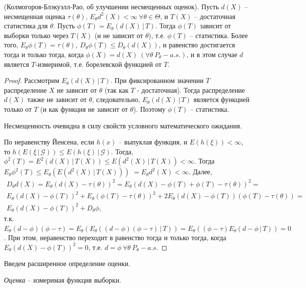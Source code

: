 \begin{theorem}
    (Колмогоров-Блэкуэлл-Рао, об улучшении несмещенных оценок). Пусть $d(X)$ -- несмещенная оценка $\tau(\theta)$, $E_\theta d^2(X) < \infty\ \forall \theta \in \Theta$, и $T(X)$ -- достаточная статистика для $\theta$. Пусть $\phi(T) = E_\theta(d(X)\, \vert\, T)$. Тогда $\phi(T)$ зависит от выборки только через $T(X)$ (и не зависит от $\theta$), т.е. $\phi(T)$ -- статистика. Более того, $E_\theta \phi(T) = \tau(\theta),\ D_\theta \phi(T) \leq D_\theta(d(X))$, и равенство достигается тогда и только тогда, когда $\phi(X) = d(X)\ (\forall \theta\ P_\theta-a.s.)$, и в этом случае $d$ является $T$-измеримой, т.е. борелевской функцией от $T$.
\end{theorem}
\begin{proof}
    Рассмотрим  $E_\theta(d(X)\, \vert\, T)$. При фиксированном значении $T$ распределение $X$ не зависит от $\theta$ (так как $T$ - достаточная). Тогда распределение $d(X)$ также не зависит от $\theta$, следовательно, $E_\theta(d(X)\, \vert\, T)$ является функцией только от $T$ (и как функция не зависит от $\theta$). Поэтому $\phi(T)$ -- статистика.
    
    Несмещенность очевидна в силу свойств условного математического ожидания.
    
    По неравенству Йенсена, если $h(x)$ -- выпуклая функция, и $E(h(\xi))<\infty$, то $h(E(\xi\, \vert\, \mathcal{G})) \leq E(h(\xi)\, \vert\, \mathcal{G})$. Тогда, $\phi^2(T) = E^2(d(X)\, \vert\, T(X)) \leq E(d^2(X)\, \vert\, T(X)) < \infty$. Тогда $E_\theta\phi^2(T) \leq E_\theta(E(d^2(X)\, \vert\, T(X)))$ $ = E_\theta d^2(X) < \infty$. Далее,
    \begin{gather*}
        D_\theta d(X) = E_\theta(d(X) - \tau(\theta))^2 = E_\theta(d(X) - \phi(T) + \phi(T) - \tau(\theta))^2 =\\
        E_\theta(d(X) - \phi(T))^2 + E_\theta(\phi(T) - \tau(\theta))^2 + 2E_\theta(d(X) - \phi(T))(\phi(T) - \tau(\theta)) =\\ E_\theta(d(X) - \phi(T))^2 + D_\theta\phi,
    \end{gather*}
    т.к. $E_\theta(d - \phi)(\phi - \tau) = E_\theta(E_\theta((d-\phi)(\phi - \tau)\, \vert\, T)) = E_\theta((\phi - \tau)E_\theta(d - \phi\, \vert\, T)) = 0$.
    При этом, неравенство переходит в равенство тогда и только тогда, когда $E_\theta(d(X)-\phi(T))^2 = 0$, т.е. $d=\phi\ \forall \theta\ P_\theta-a.s.$
\end{proof}
Введем расширенное определение оценки.
\begin{definition}
    \textit{Оценка} -- измеримая функция выборки.
\end{definition}
